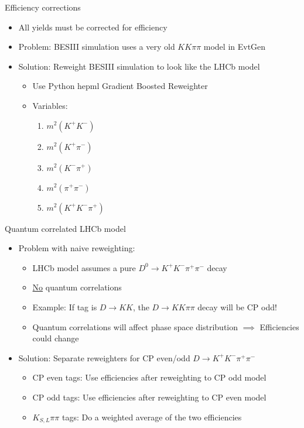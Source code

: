 \documentclass{beamer}
\begin{document}
\begin{frame}{Efficiency corrections}
  \begin{itemize}
    \setlength\itemsep{1.5em}
    \item{All yields must be corrected for efficiency}
    \item{Problem: BESIII simulation uses a very old $KK\pi\pi$ model in EvtGen}
    \item{Solution: Reweight BESIII simulation to look like the LHCb model}
    \begin{itemize}
      \setlength\itemsep{0.5em}
      \item{Use Python hep\textunderscore ml Gradient Boosted Reweighter}
      \item{Variables:}
      \begin{enumerate}
        \item{$m^2(K^+K^-)$}
        \item{$m^2(K^+\pi^-)$}
        \item{$m^2(K^-\pi^+)$}
        \item{$m^2(\pi^+\pi^-)$}
        \item{$m^2(K^+K^-\pi^+)$}
      \end{enumerate}
    \end{itemize}
  \end{itemize}
\end{frame}

\begin{frame}{Quantum correlated LHCb model}
  \begin{itemize}
    \setlength\itemsep{1.5em}
    \item{Problem with naive reweighting:}
    \begin{itemize}
    \setlength\itemsep{1.0em}
      \item{LHCb model assumes a pure $D^0\to K^+K^-\pi^+\pi^-$ decay}
      \item{\underline{No} quantum correlations}
      \item{Example: If tag is $D\to KK$, the $D\to KK\pi\pi$ decay will be CP odd!}
      \item{Quantum correlations will affect phase space distribution $\implies$ Efficiencies could change}
    \end{itemize}
    \item{Solution: Separate reweighters for CP even/odd $D\to K^+K^-\pi^+\pi^-$}
    \begin{itemize}
    \setlength\itemsep{1.0em}
      \item{CP even tags: Use efficiencies after reweighting to CP odd model}
      \item{CP odd tags: Use efficiencies after reweighting to CP even model}
      \item{$K_{S, L}\pi\pi$ tags: Do a weighted average of the two efficiencies}
    \end{itemize}
  \end{itemize}
\end{frame}
\end{document}
